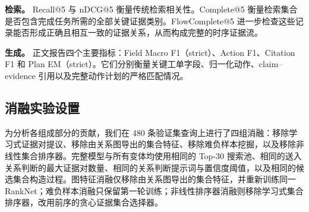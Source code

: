 \textbf{检索。}
Recall@5 与 nDCG@5 衡量传统检索相关性。Complete@5 衡量检索集合是否包含完成任务所需的全部关键证据类别。FlowComplete@5 进一步检查这些记录能否形成正确且相互一致的证据关系，从而构成完整的时序证据流。

\textbf{生成。}
正文报告四个主要指标：Field Macro F1（strict）、Action F1、Citation F1 和 Plan EM（strict）。它们分别衡量关键工单字段、归一化动作、claim--evidence 引用以及完整动作计划的严格匹配情况。

\subsection{消融实验设置}

为分析各组成部分的贡献，我们在 480 条验证集查询上进行了四组消融：移除学习式证据对提议、移除由关系图导出的集合特征、移除难负样本挖掘，以及移除非线性集合排序器。完整模型与所有变体均使用相同的 Top-30 搜索池、相同的送入关系判断的最大证据对数量、相同的关系判断提示词与置信度阈值，以及相同的候选集合构造过程。图特征消融仅移除由关系图导出的集合特征，并重新训练同一 RankNet；难负样本消融只保留第一轮训练；非线性排序器消融则移除学习式集合排序器，改用前序的贪心证据集合选择器。
